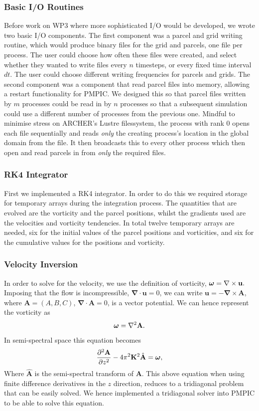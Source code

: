 \documentclass{article}
\renewcommand{\v}[1]{\ensuremath{\mathbf{#1}}} %
\newcommand{\gv}[1]{\ensuremath{\mbox{\boldmath$ #1 $}}}
\newcommand{\pp}[2]{\frac{\partial^2 #1}{\partial #2^2}}
\renewcommand{\div}[1]{\v{\nabla} \cdot #1} %
\newcommand{\curl}[1]{\v{\nabla} \times #1} %
\begin{document}
\subsubsection{Basic I/O Routines}
Before work on WP3 where more sophisticated I/O would be developed, we wrote two basic I/O components. The first component was a parcel and grid writing routine, which would produce binary files for the grid and parcels, one file per process. The user could choose how often these files were created, and select whether they wanted to write files every $n$ timesteps, or every fixed time interval $dt$. The user could choose different writing frequencies for parcels and grids.
The second component was a component that read parcel files into memory, allowing a restart functionality for PMPIC. We designed this so that parcel files written by $m$ processes could be read in by $n$ processes so that a subsequent simulation could use a different number of processes from the previous one. Mindful to minimise stress on ARCHER's Lustre filessystem, the process with rank 0 opens each file sequentially and reads \emph{only} the creating process's location in the global domain from the file. It then broadcasts this to every other process which then open and read parcels in from \emph{only} the required files.


\subsubsection{RK4 Integrator}
 First we implemented a RK4 integrator. In order to do this we required storage for temporary arrays during the integration process. The quantities that are evolved are the vorticity and the parcel positions, whilst the gradients used are the velocities and vorticity tendencies. In total twelve temporary arrays are needed, six for the initial values of the parcel positions and vorticities, and six for the cumulative values for the positions and vorticity.

\subsubsection{Velocity Inversion}\label{inversion}
In order to solve for the velocity, we use the definition of vorticity,
$
  \gv{\omega} = \curl{\v{u}}.
$
Imposing that the flow is incompressible, $\div{\v{u}} = 0$, we can write $\v{u} = - \curl{\v{A}}$, where $\v{A} = (A,B,C)$, $\div{\v{A}} = 0$, is a vector potential. We can hence represent the vorticity as
\begin{equation}
  \gv{\omega} = \v{\nabla}^2 \v{A}.
\end{equation}
In semi-spectral space this equation becomes
\begin{equation} \label{vort2vel_eq}
  \pp{\v{A}}{z} - 4\pi^2 \v{K}^2 \hat{\v{A}}= \gv{\omega},
\end{equation}
Where $\hat{\v{A}}$ is the semi-spectral transform of $\v{A}$. This above equation when using finite difference derivatives in the $z$ direction, reduces to a tridiagonal problem that can be easily solved. We hence implemented a tridiagonal solver into PMPIC to be able to solve this equation.
\end{document}

